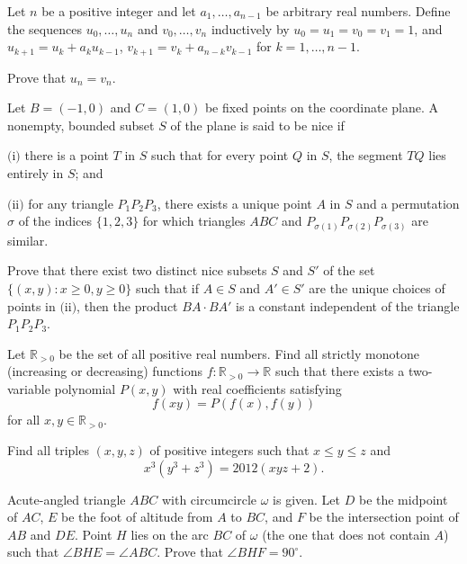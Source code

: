 \documentclass[11pt]{scrartcl}
\begin{document}
\begin{problem}[352746613208735]
	Let $n$ be a positive integer and let $a_1, \ldots, a_{n-1} $ be arbitrary real numbers. Define the sequences $u_0, \ldots, u_n $ and $v_0, \ldots, v_n $ inductively by $u_0 = u_1  = v_0 = v_1 = 1$, and $u_{k+1} = u_k + a_k u_{k-1}$, $v_{k+1} = v_k + a_{n-k} v_{k-1}$ for $k=1, \ldots, n-1.$

Prove that $u_n = v_n.$
\end{problem}
\begin{problem}[357249331453104]
Let $B = (-1, 0)$ and $C = (1, 0)$ be fixed points on the coordinate plane. A nonempty, bounded subset $S$ of the plane is said to be nice if

$\text{(i)}$ there is a point $T$ in $S$ such that for every point $Q$ in $S$, the segment $TQ$ lies entirely in $S$; and

$\text{(ii)}$ for any triangle $P_1P_2P_3$, there exists a unique point $A$ in $S$ and a permutation $\sigma$ of the indices $\{1, 2, 3\}$ for which triangles $ABC$ and $P_{\sigma(1)}P_{\sigma(2)}P_{\sigma(3)}$ are similar.

Prove that there exist two distinct nice subsets $S$ and $S'$ of the set $\{(x, y) : x \geq 0, y \geq 0\}$ such that if $A \in S$ and $A' \in S'$ are the unique choices of points in $\text{(ii)}$, then the product $BA \cdot BA'$ is a constant independent of the triangle $P_1P_2P_3$.
\end{problem}
\begin{problem}[361772755079059]
Let $\mathbb{R}_{>0}$ be the set of all positive real numbers. Find all strictly monotone (increasing or decreasing) functions $f:\mathbb{R}_{>0} \to \mathbb{R}$ such that there exists a two-variable polynomial $P(x, y)$ with real coefficients satisfying
$$
f(xy)=P(f(x), f(y))
$$for all $x, y\in\mathbb{R}_{>0}$.
\end{problem}
\begin{problem}[365155864249414]
Find all triples $(x,y,z)$ of positive integers such that $x \leq y \leq z$ and
\[x^3(y^3+z^3)=2012(xyz+2).\]
\end{problem}
\begin{problem}[371185267312965]
Acute-angled triangle $ABC$ with circumcircle $\omega$ is given. Let $D$ be the midpoint of $AC$, $E$ be the foot of altitude from $A$ to $BC$, and $F$ be the intersection point of $AB$ and $DE$. Point $H$ lies on the arc $BC$ of $\omega$ (the one that does not contain $A$) such that $\angle BHE=\angle ABC$. Prove that $\angle BHF=90^\circ$.
\end{problem}
\end{document}

